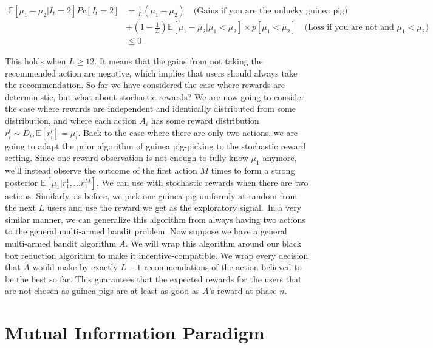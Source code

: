\documentclass[
  letterpaper,
  numbers=noenddot,
  DIV=11]{scrreprt}
\theoremstyle{plain}
\theoremstyle{definition}
\theoremstyle{remark}
\begin{document}
\[
\begin{split}
    \mathbb{E}[\mu_1 - \mu_2 | I_t = 2] Pr[I_t = 2] &= \frac{1}{L} (\mu_1 - \mu_2) \quad \text{(Gains if you are the unlucky guinea pig)}\\
    &+ (1 - \frac{1}{L}) \mathbb{E}[\mu_1 - \mu_2 | \mu_1 < \mu_2] \times p[\mu_1 < \mu_2] \quad \text{(Loss if you are not and $\mu_1 < \mu_2$)}\\
    &\leq 0
\end{split}
\]

This holds when \(L \geq 12\). It means that the gains from not taking
the recommended action are negative, which implies that users should
always take the recommendation. So far we have considered the case where
rewards are deterministic, but what about stochastic rewards? We are now
going to consider the case where rewards are independent and identically
distributed from some distribution, and where each action \(A_i\) has
some reward distribution \(r_i^t \sim D_i, \mathbb{E}[r_i^t] = \mu_i\).
Back to the case where there are only two actions, we are going to adapt
the prior algorithm of guinea pig-picking to the stochastic reward
setting. Since one reward observation is not enough to fully know
\(\mu_1\) anymore, we'll instead observe the outcome of the first action
\(M\) times to form a strong posterior
\(\mathbb{E}[\mu_1 | r_1^1, \ldots r_1^M]\). We can use with stochastic
rewards when there are two actions. Similarly, as before, we pick one
guinea pig uniformly at random from the next \(L\) users and use the
reward we get as the exploratory signal.~In a very similar manner, we
can generalize this algorithm from always having two actions to the
general multi-armed bandit problem. Now suppose we have a general
multi-armed bandit algorithm \(A\). We will wrap this algorithm around
our black box reduction algorithm to make it incentive-compatible. We
wrap every decision that \(A\) would make by exactly \(L-1\)
recommendations of the action believed to be the best so far. This
guarantees that the expected rewards for the users that are not chosen
as guinea pigs are at least as good as \(A\)'s reward at phase \(n\).

\section{Mutual Information Paradigm}\label{mutual-information-paradigm}
\end{document}
